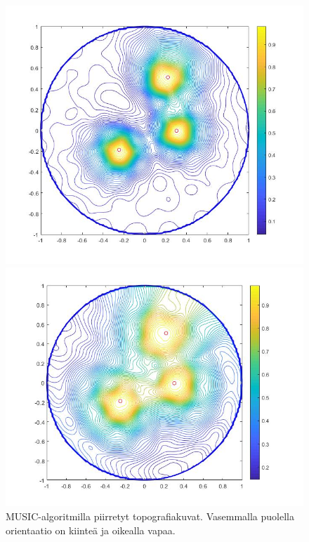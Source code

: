 \begin{figure}[hb]
    \begin{minipage}{0.5\textwidth}
        \centering
        \includegraphics[width=\textwidth]{mfix.jpg} 
    \end{minipage}
    \begin{minipage}{0.5\textwidth}
        \centering
        \includegraphics[width=\textwidth]{mfree.jpg}
    \end{minipage}
    \caption{MUSIC-algoritmilla piirretyt topografiakuvat. Vasemmalla puolella orientaatio on kiinteä ja oikealla vapaa.}
    \label{fig:music}
\end{figure}

